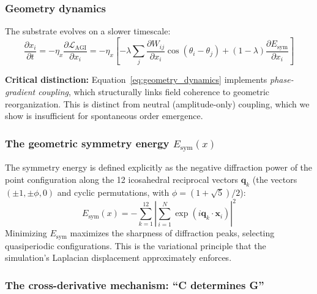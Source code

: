 \documentclass[12pt,a4paper]{article}
\theoremstyle{plain}
\theoremstyle{definition}
\begin{document}
\subsubsection{Geometry dynamics}

The substrate evolves on a slower timescale:
\begin{equation}
\label{eq:geometry_dynamics}
\frac{\partial x_i}{\partial t} = -\eta_x \frac{\partial \mathcal{L}_{\text{AGI}}}{\partial x_i} = -\eta_x \left[ -\lambda \sum_j \frac{\partial W_{ij}}{\partial x_i} \cos(\theta_i - \theta_j) + (1-\lambda) \frac{\partial E_{\text{sym}}}{\partial x_i} \right]
\end{equation}

\textbf{Critical distinction:} Equation~\eqref{eq:geometry_dynamics} implements
\emph{phase-gradient coupling}, which structurally links field coherence
to geometric reorganization. This is distinct from neutral (amplitude-only)
coupling, which we show is insufficient for spontaneous order emergence.

\subsubsection{The geometric symmetry energy $E_{\text{sym}}(x)$}

The symmetry energy is defined explicitly as the negative diffraction power
of the point configuration along the 12 icosahedral reciprocal vectors
$\mathbf{q}_k$ (the vectors $(\pm 1, \pm \phi, 0)$ and cyclic permutations,
with $\phi = (1+\sqrt{5})/2$):
\begin{equation}
\label{eq:esym}
E_{\text{sym}}(x) = -\sum_{k=1}^{12} \left| \sum_{i=1}^{N} \exp(i \mathbf{q}_k \cdot \mathbf{x}_i) \right|^2
\end{equation}
Minimizing $E_{\text{sym}}$ maximizes the sharpness of diffraction peaks,
selecting quasiperiodic configurations. This is the variational principle
that the simulation's Laplacian displacement approximately enforces.

\subsubsection{The cross-derivative mechanism: ``C determines G''}
\end{document}

